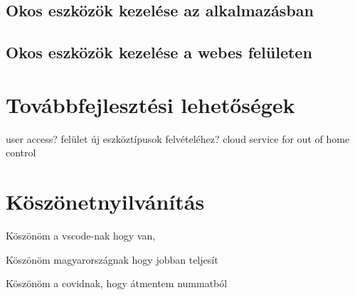 \documentclass[
]{thesis-ekf}
\theoremstyle{definition}
\theoremstyle{remark}
\begin{document}
\section{Okos eszközök kezelése az alkalmazásban}
\section{Okos eszközök kezelése a webes felületen}



\chapter{Továbbfejlesztési lehetőségek}
user access? felület új eszköztípusok felvételéhez?
cloud service for out of home control



\chapter*{Köszönetnyilvánítás}
\par
Köszönöm a vscode-nak hogy van,
\par
Köszönöm magyarországnak hogy jobban teljesít
\par
Köszönöm a covidnak, hogy átmentem nummatból
\end{document}
